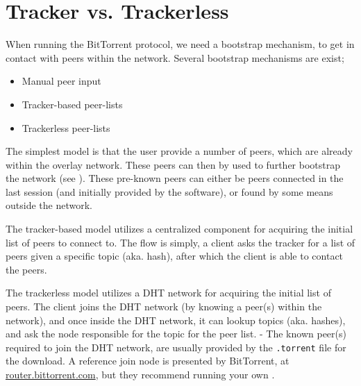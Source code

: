 \section{Tracker vs. Trackerless}
\label{sec:trackerless}
When running the BitTorrent protocol, we need a bootstrap mechanism, to get in
contact with peers within the network. Several bootstrap mechanisms are exist;
\begin{itemize}
\item Manual peer input
\item Tracker-based peer-lists
\item Trackerless peer-lists
\end{itemize}
The simplest model is that the user provide a number of peers, which are
already within the overlay network. These peers can then by used to further
bootstrap the network (see \citep{bittorrent:bep11}). These pre-known peers
can either be peers connected in the last session (and initially provided by
the software), or found by some means outside the network.

The tracker-based model utilizes a centralized component for acquiring the
initial list of peers to connect to. The flow is simply, a client asks the
tracker for a list of peers given a specific topic (aka. hash), after which the
client is able to contact the peers.

The trackerless model utilizes a \acs{DHT} network for acquiring the initial list of 
peers. The client joins the \acs{DHT} network (by knowing a peer(s) within the network),
and once inside the \acs{DHT} network, it can lookup topics (aka. hashes), and ask
the node responsible for the topic for the peer list.
\newline
- The known peer(s) required to join the \acs{DHT} network, are usually provided by
the \verb|.torrent| file for the download. A reference join node is presented
by BitTorrent, at \url{router.bittorrent.com}, but they recommend running your
own \citep{bittorrent:bep05}.

